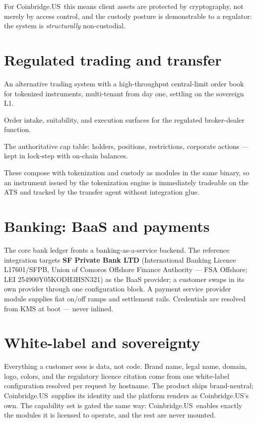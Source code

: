 \documentclass[11pt,a4paper]{article}
\newcommand{\customer}{Coinbridge.US}
\begin{document}
For \customer\ this means client assets are protected by cryptography, not
merely by access control, and the custody posture is demonstrable to a
regulator: the system is \emph{structurally} non-custodial.

\section{Regulated trading and transfer}

\begin{description}[leftmargin=*]
  \item[ATS] An alternative trading system with a high-throughput
  central-limit order book for tokenized instruments, multi-tenant from
  day one, settling on the sovereign L1.
  \item[Broker-Dealer] Order intake, suitability, and execution surfaces
  for the regulated broker-dealer function.
  \item[Transfer Agent] The authoritative cap table: holders, positions,
  restrictions, corporate actions --- kept in lock-step with on-chain
  balances.
\end{description}

These compose with tokenization and custody as modules in the same
binary, so an instrument issued by the tokenization engine is immediately
tradeable on the ATS and tracked by the transfer agent without
integration glue.

\section{Banking: BaaS and payments}

The core bank ledger fronts a banking-as-a-service backend. The reference
integration targets \textbf{SF Private Bank LTD} (International Banking
Licence L17601/SFPB, Union of Comoros Offshore Finance Authority --- FSA
Offshore; LEI 254900Y05KODH3HSN321) as the BaaS provider; a customer
swaps in its own provider through one configuration block. A payment
service provider module supplies fiat on/off ramps and settlement rails.
Credentials are resolved from KMS at boot --- never inlined.

\section{White-label and sovereignty}

Everything a customer sees is data, not code. Brand name, legal name,
domain, logo, colors, and the regulatory licence citation come from one
white-label configuration resolved per request by hostname. The product
ships brand-neutral; \customer\ supplies its identity and the platform
renders as \customer's own. The capability set is gated the same way:
\customer\ enables exactly the modules it is licensed to operate, and the
rest are never mounted.
\end{document}
